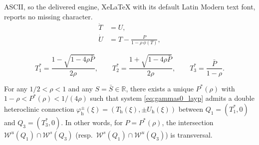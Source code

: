 \documentclass[10pt,a4paper]{amsart}
\begin{document}
ASCII, so the delivered engine, XeLaTeX with its default Latin Modern text font, reports no missing character.
\begin{subequations}\label{eq:gammas0_layp}
    \begin{align}
        \dot{T} &= U,\\
        \dot{U} &= T - \frac{P}{1 - \rho\,\phi(T)},
    \end{align}
\end{subequations}

\begin{equation} \label{eq:equilCM}
    T_1^\ast = \frac{1-\sqrt{1-4\rho \bar{P}}}{2 \rho}, \qquad T_2^\ast = \frac{1+\sqrt{1-4\rho \bar{P}}}{2 \rho}, \qquad T_3^\ast = \frac{\bar{P}}{1-\rho}.
\end{equation}

\begin{prop} \label{prop:hetconn}
    For any $1/2 < \rho < 1$ and any $S=\bar{S} \in \mathbb{R}$, there exists a unique $P^\ast(\rho)$ with $1-\rho < P^\ast(\rho) < 1/(4\rho)$ such that system \eqref{eq:gammas0_layp} admits a double heteroclinic connection $\varphi_\mathrm{h}^\pm(\xi) = \left(T_\mathrm{h}(\xi),\pm U_\mathrm{h}(\xi)\right)$ between $Q_1=(T_1^\ast, 0 )$ and $Q_3=(T_3^\ast, 0 )$. In other words, for $P = P^\ast(\rho)$, the intersection $\mathcal{W}^{u}(Q_1) \cap \mathcal{W}^{s}(Q_3)$ (resp.~$\mathcal{W}^{s}(Q_1) \cap \mathcal{W}^{u}(Q_3)$) is transversal.
\end{prop}
\end{document}
